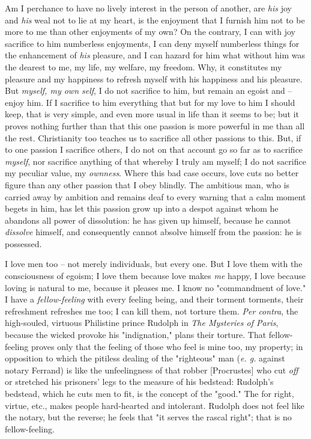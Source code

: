 Am I perchance to have no lively interest in the person of another, are 
\textit{his} joy and \textit{his} weal not to lie at my heart, is the 
enjoyment that I furnish him not to be more to me than other enjoyments of my 
own? On the contrary, I can with joy sacrifice to him numberless enjoyments, I 
can deny myself numberless things for the enhancement of \textit{his} 
pleasure, and I can hazard for him what without him was the dearest to me, my 
life, my welfare, my freedom. Why, it constitutes my pleasure and my happiness 
to refresh myself with his happiness and his pleasure. But \textit{myself, my 
own self}, I do not sacrifice to him, but remain an egoist and -- enjoy him. 
If I sacrifice to him everything that but for my love to him I should keep, 
that is very simple, and even more usual in life than it seems to be; but it 
proves nothing further than that this one passion is more powerful in me than 
all the rest. Christianity too teaches us to sacrifice all other passions to 
this. But, if to one passion I sacrifice others, I do not on that account go 
so far as to sacrifice \textit{myself}, nor sacrifice anything of that whereby 
I truly am myself; I do not sacrifice my peculiar value, my \textit{ownness}. 
Where this bad case occurs, love cuts no better figure than any other passion 
that I obey blindly. The ambitious man, who is carried away by ambition and 
remains deaf to every warning that a calm moment begets in him, has let this 
passion grow up into a despot against whom he abandons all power of 
dissolution: he has given up himself, because he cannot \textit{dissolve} 
himself, and consequently cannot absolve himself from the passion: he is 
possessed.

I love men too -- not merely individuals, but every one. But I love them with 
the consciousness of egoism; I love them because love makes \textit{me} happy, 
I love because loving is natural to me, because it pleases me. I know no 
"{}commandment of love."{} I have a \textit{fellow-feeling} with every feeling 
being, and their torment torments, their refreshment refreshes me too; I can 
kill them, not torture them. \textit{Per contra}, the high-souled, virtuous 
Philistine prince Rudolph in \textit{The Mysteries of Paris}, because the 
wicked provoke his "{}indignation,"{} plans their torture. That fellow-feeling 
proves only that the feeling of those who feel is mine too, my property; in 
opposition to which the pitiless dealing of the "{}righteous"{} man 
(\textit{e. g.} against notary Ferrand) is like the unfeelingness of that 
robber [Procrustes] who cut \textit{off} or stretched his prisoners' legs to 
the measure of his bedstead: Rudolph's bedstead, which he cuts men to fit, is 
the concept of the "{}good."{} The for right, virtue, etc., makes people 
hard-hearted and intolerant. Rudolph does not feel like the notary, but the 
reverse; he feels that "{}it serves the rascal right"{}; that is no 
fellow-feeling.

